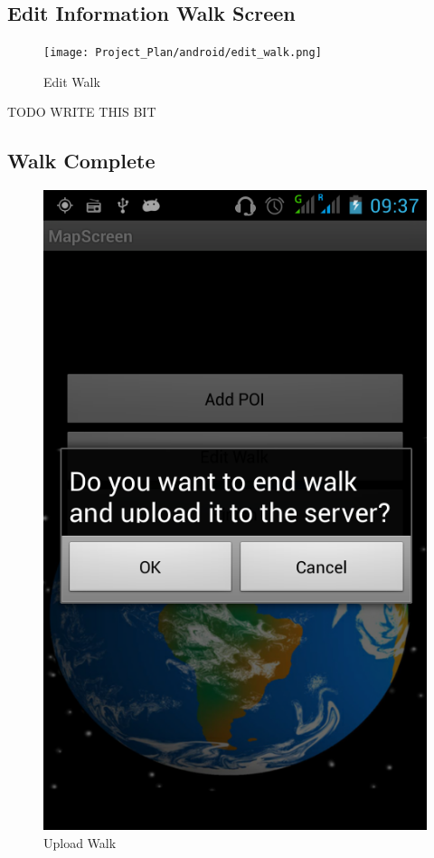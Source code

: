 \documentclass[12pt]{article}
\begin{document}
\subsection{Edit Information Walk Screen}
\begin{figure}[htp]
\centering
\texttt{[image: Project\_Plan/android/edit\_walk.png]}
\caption{Edit Walk}
\label{Edit Walk}
\end{figure}
TODO WRITE THIS BIT
\clearpage
\subsection{Walk Complete}
\begin{figure}[htp]
\centering
\includegraphics[scale=0.40]{Project_Plan/android/upload_walk.png}
\caption{Upload Walk}
\label{Upload Walk}
\end{figure}
\end{document}

